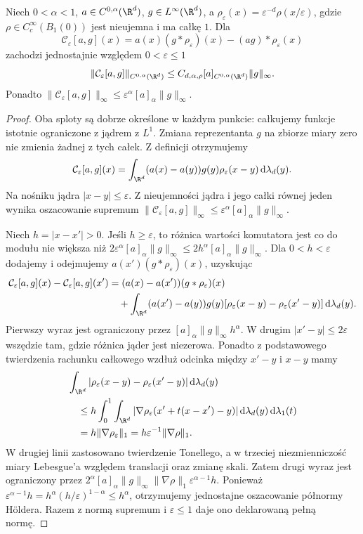\begin{lemat}
\label{lem:pde16-commutator}
Niech $0<\alpha<1$, $a\in C^{0,\alpha}(\R^d)$,
$g\in L^\infty(\R^d)$, a $\rho_\varepsilon(x)
=\varepsilon^{-d}\rho(x/\varepsilon)$, gdzie
$\rho\in C_c^\infty(B_1(0))$ jest nieujemna i ma całkę $1$.
Dla
\[
 \mathcal C_\varepsilon[a,g](x)
 =a(x)(g*\rho_\varepsilon)(x)
 -(ag)*\rho_\varepsilon(x)
\]
zachodzi jednostajnie względem $0<\varepsilon\le1$
\[
 \|\mathcal C_\varepsilon[a,g]\|_{C^{0,\alpha}(\R^d)}
 \le C_{d,\alpha,\rho}[a]_{C^{0,\alpha}(\R^d)}\|g\|_\infty.
\]
Ponadto $\|\mathcal C_\varepsilon[a,g]\|_\infty
\le \varepsilon^\alpha[a]_\alpha\|g\|_\infty$.
\end{lemat}
\begin{proof}
Oba sploty są dobrze określone w każdym punkcie:
całkujemy funkcje istotnie ograniczone z jądrem
z $L^1$. Zmiana reprezentanta $g$ na zbiorze miary zero
nie zmienia żadnej z tych całek.
Z definicji otrzymujemy
\[
 \mathcal C_\varepsilon[a,g](x)
 =\int_{\R^d}(a(x)-a(y))g(y)\rho_\varepsilon(x-y)
 \,\mathrm d\lambda_d(y).
\]
Na nośniku jądra $|x-y|\le\varepsilon$.
Z nieujemności jądra i jego całki równej jeden
wynika oszacowanie supremum
$\|\mathcal C_\varepsilon[a,g]\|_\infty
\le\varepsilon^\alpha[a]_\alpha\|g\|_\infty$.

Niech $h=|x-x'|>0$. Jeśli $h\ge\varepsilon$,
to różnica wartości komutatora jest co do modułu
nie większa niż
$2\varepsilon^\alpha[a]_\alpha\|g\|_\infty
\le2h^\alpha[a]_\alpha\|g\|_\infty$.
Dla $0<h<\varepsilon$ dodajemy i odejmujemy
$a(x')(g*\rho_\varepsilon)(x)$, uzyskując
\begin{align*}
 \mathcal C_\varepsilon[a,g](x)-\mathcal C_\varepsilon[a,g](x')
 &= (a(x)-a(x'))(g*\rho_\varepsilon)(x)\\
 &\quad+\int_{\R^d}(a(x')-a(y))g(y)
 [\rho_\varepsilon(x-y)-\rho_\varepsilon(x'-y)]
 \,\mathrm d\lambda_d(y).
\end{align*}
Pierwszy wyraz jest ograniczony przez
$[a]_\alpha\|g\|_\infty h^\alpha$.
W drugim $|x'-y|\le2\varepsilon$ wszędzie tam,
gdzie różnica jąder jest niezerowa.
Ponadto z podstawowego twierdzenia rachunku całkowego
wzdłuż odcinka między $x'-y$ i $x-y$ mamy
\[
 \begin{aligned}
 &\int_{\R^d}|\rho_\varepsilon(x-y)
               -\rho_\varepsilon(x'-y)|\,\mathrm d\lambda_d(y)\\
 &\quad\le h\int_0^1\int_{\R^d}
 |\nabla\rho_\varepsilon(x'+t(x-x')-y)|
 \,\mathrm d\lambda_d(y)\,\mathrm d\lambda_1(t)\\
 &\quad=h\|\nabla\rho_\varepsilon\|_1
 =h\varepsilon^{-1}\|\nabla\rho\|_1.
 \end{aligned}
\]
W drugiej linii zastosowano twierdzenie Tonellego,
a w trzeciej niezmienniczość miary Lebesgue'a
względem translacji oraz zmianę skali.
Zatem drugi wyraz jest ograniczony przez
$2^\alpha[a]_\alpha\|g\|_\infty\|\nabla\rho\|_1
\varepsilon^{\alpha-1}h$.
Ponieważ $\varepsilon^{\alpha-1}h
=h^\alpha(h/\varepsilon)^{1-\alpha}\le h^\alpha$,
otrzymujemy jednostajne oszacowanie półnormy Höldera.
Razem z normą supremum i $\varepsilon\le1$
daje ono deklarowaną pełną normę.
\end{proof}

